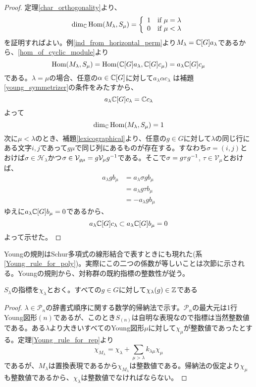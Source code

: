 \documentclass{ltjsreport}
\begin{document}
\begin{proof}
  定理\ref{char_orthogonality}より、
  \[
  \dim_{\mathbb{C}}\text{Hom}(M_\lambda,S_\mu)=
  \left\{\begin{array}{cc}
    1 & \text{if $\mu=\lambda$}\\
    0 & \text{if $\mu<\lambda$}
  \end{array}\right.  
  \]
  を証明すればよい。例\ref{ind_from_horizontal_perm}より$M_\lambda=\mathbb{C}[G]a_\lambda$であるから、\ref{hom_of_cyclic_module}より
  \[
  \text{Hom}(M_\lambda,S_\mu)=\text{Hom}(\mathbb{C}[G]a_\lambda,\mathbb{C}[G]c_\mu)=a_\lambda\mathbb{C}[G]c_\mu 
  \]
  である。$\lambda=\mu$の場合、任意の$\alpha\in\mathbb{C}[G]$に対して$a_\lambda\alpha c_\lambda$ は補題\ref{young_symmetrizer}の条件をみたすから、
  \[
  a_\lambda\mathbb{C}[G]c_\lambda=\mathbb{C} c_\lambda
  \]
  よって
  \[
  \dim_{\mathbb{C}}\text{Hom}(M_\lambda,S_\mu)=1  
  \]
  次に$\mu<\lambda$のとき、補題\ref{lexicographical}より、任意の$g\in G$に対して$\lambda$の同じ行にある文字$i,j$であって$g\mu$で同じ列にあるものが存在する。すなわち$\sigma=(i,j)$とおけば$\sigma\in \mathcal{H}_\lambda$かつ$\sigma\in\mathcal{V}_{g\mu}=g\mathcal{V}_{\mu}g^{-1}$である。そこで$\sigma=g\tau g^{-1}$, $\tau\in\mathcal{V}_\mu$とおけば、
  \begin{align*}
    a_\lambda g b_\mu
    &=a_\lambda\sigma g b_\mu\\
    &=a_\lambda g\tau b_\mu\\
    &=-a_\lambda g b_\mu
  \end{align*}
  ゆえに$a_\lambda\mathbb{C}[G]b_\mu=0$であるから、
  \[
  a_\lambda\mathbb{C}[G]c_\lambda\subset a_\lambda\mathbb{C}[G]b_\mu=0
  \]
  よって示せた。
\end{proof}

Youngの規則はSchur多項式の線形結合で表すときにも現れた(系\ref{Young_rule_for_poly})。実際にこの二つの係数が等しいことは次節に示される。Youngの規則から、対称群の既約指標の整数性が従う。

\begin{cor}\label{char_integrity}
  $S_\lambda$の指標を$\chi_{\lambda}$とおく。すべての$g\in G$に対して$\chi_\lambda(g)\in\mathbb{Z}$である
\end{cor}

\begin{proof}
  $\lambda\in\mathcal{P}_n$の辞書式順序に関する数学的帰納法で示す。$\mathcal{P}_n$の最大元は1行Young図形$(n)$であるが、このとき$S_{(n)}$は自明な表現なので指標は当然整数値である。ある$\lambda$より大きいすべてのYoung図形$\mu$に対して$\chi_\mu$が整数値であったとする。定理\ref{Young_rule_for_rep}より
  \[
  \chi_{M_\lambda}  =\chi_{\lambda}+\sum_{\mu>\lambda}k_{\lambda\mu}\chi_\mu
  \]
  であるが、$M_\lambda$は置換表現であるから$\chi_{M_\lambda}$は整数値である。帰納法の仮定より$\chi_\mu$も整数値であるから、$\chi_\lambda$は整数値でなければならない。
\end{proof}
\end{document}
